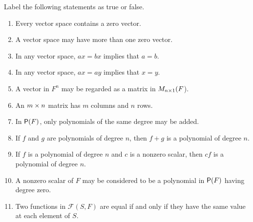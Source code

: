 \exercisesection

\begin{exercise} \label{exercise 1.2.1}
Label the following statements as true or false.
\begin{enumerate}
\item Every vector space contains a zero vector.
\item A vector space may have more than one zero vector.
\item In any vector space, \(ax = bx\) implies that \(a = b\).
\item In any vector space, \(ax = ay\) implies that \(x = y\).
\item A vector in \(F^n\) may be regarded as a matrix in \(M_{n \times 1}(F \)).
\item An \(m \times n\) matrix has \(m\) columns and \(n\) rows.
\item In \(\textsf{P}(F)\), only polynomials of the same degree may be added.
\item If \(f\) and \(g\) are polynomials of degree \(n\), then \(f + g\) is a polynomial of degree \(n\).
\item If \(f\) is a polynomial of degree \(n\) and \(c\) is a nonzero scalar, then \(cf\) is a polynomial of degree \(n\).
\item A nonzero scalar of \(F\) may be considered to be a polynomial in \(\textsf{P}(F)\) having degree zero.
\item Two functions in \(\mathcal{F}(S, F)\) are equal if and only if they have the same value at each element of \(S\).
\end{enumerate}
\end{exercise}

